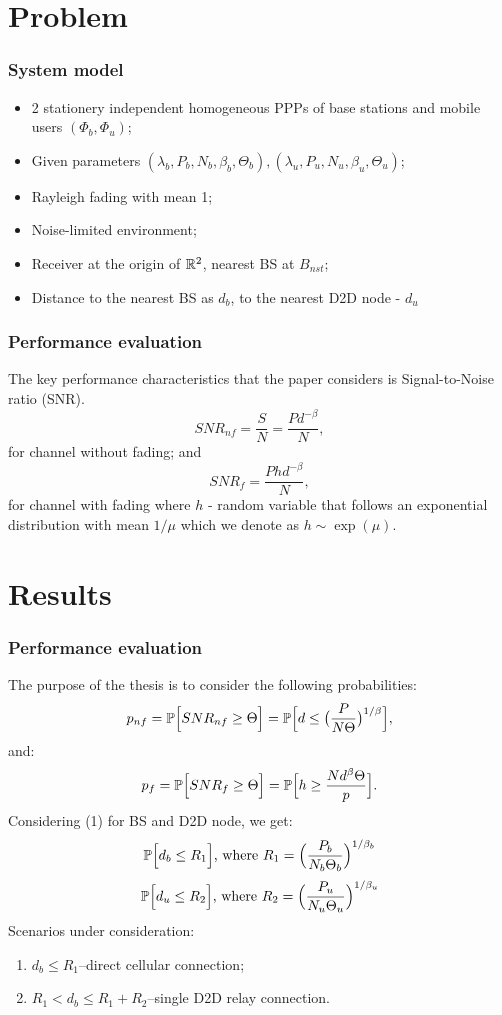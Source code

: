 \section {Problem}

\begin {frame}
  \frametitle {System model}
  \begin{itemize}
    \item 2 stationery independent homogeneous PPPs of base stations and mobile users \((\Phi_b, \Phi_u)\);
    \item Given parameters \((\lambda_b,P_b,N_b,\beta_b,\Theta_b),(\lambda_u,P_u,N_u,\beta_u,\Theta_u)\);
    \item Rayleigh fading with mean 1;
    \item Noise-limited environment;
    \item Receiver at the origin of \(\R^2\), nearest BS at \(B_{nst}\);
    \item Distance to the nearest BS as \(d_b\), to the nearest D2D node - \(d_u\)
  \end{itemize}
\end {frame}

\begin {frame}
  \frametitle {Performance evaluation}
\par The key performance characteristics that the paper considers is Signal-to-Noise ratio (SNR).
\[SNR_{nf}=\frac {S} {N}=\frac {Pd^{-\beta}} {N},\]
for channel without fading; and
\[SNR_f=\frac {Phd^{-\beta}} {N},\]
for channel with fading where $h$ - random variable that follows an exponential distribution with mean $1/\mu$ which we denote as $h\sim \exp(\mu)$.
\end {frame}

\section {Results}

\begin {frame}
  \frametitle{Performance evaluation}
The purpose of the thesis is to consider the following probabilities:
\begin{equation}
p_{nf}=\P\Big[SNR_{nf}\ge\Theta\Big]=\P\Big[d\le\big(\frac{P}{N\Theta}\big)^{1/\beta}\Big],
\end{equation}
and:
\begin{equation}
p_{f}=\P\Big[SNR_f\ge\Theta\Big]=\P\Big[h\ge\frac{Nd^{\beta}\Theta}{p}\Big].
\end{equation}
Considering (1) for BS and D2D node, we get:
\[\P\Big[d_b\le R_1\Big]\text{, where }R_1=\Big(\frac {P_b} {N_b\Theta_b}\Big)^{1/\beta_b}\]
\[\P\Big[d_u\le R_2\Big]\text{, where }R_2=\Big(\frac {P_u} {N_u\Theta_u}\Big)^{1/\beta_u}\]
Scenarios under consideration:
\begin{enumerate}
  \item \(d_b\le R_1\)--direct cellular connection;
  \item \(R_1<d_b\le R_1+R_2\)--single D2D relay connection.
\end{enumerate}
\end{frame}

